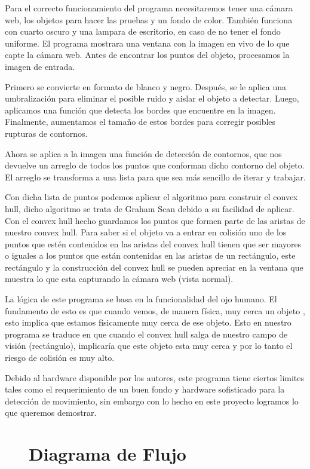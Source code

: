 \documentclass[11pt]{article}
\begin{document}
Para el correcto funcionamiento del programa necesitaremos tener una cámara web, los objetos para hacer las pruebas y un fondo de color. También funciona con cuarto oscuro y una lampara de escritorio, en caso de no tener el fondo uniforme. El programa mostrara una ventana con la imagen en vivo de lo que capte la cámara web. Antes de encontrar los puntos del objeto, procesamos la imagen de entrada.

Primero se convierte en formato de blanco y negro. Después, se le aplica una umbralización para eliminar el posible ruido y aislar el objeto a detectar. Luego, aplicamos una función que detecta los bordes que encuentre en la imagen. Finalmente, aumentamos el tamaño de estos bordes para corregir posibles rupturas de contornos.

Ahora se aplica a la imagen una función de detección de contornos, que nos devuelve un arreglo de todos los puntos que conforman dicho contorno del objeto. El arreglo se transforma a una lista para que sea más sencillo de iterar y trabajar.

Con dicha lista de puntos podemos aplicar el algoritmo para construir el convex hull, dicho algoritmo se trata de Graham Scan debido a su facilidad de aplicar. Con el convex hull hecho guardamos los puntos que formen parte de las aristas de nuestro convex hull. Para saber si el objeto va a entrar en colisión uno de los puntos que estén contenidos en las aristas del convex hull tienen que ser mayores o iguales a los puntos que están contenidas en las aristas de un rectángulo, este rectángulo y la construcción del convex hull se pueden apreciar en la ventana que muestra lo que esta capturando la cámara web (vista normal).

La lógica de este programa se basa en la funcionalidad del ojo humano. El fundamento de esto es que cuando vemos, de manera física, muy cerca un objeto , esto implica que estamos físicamente muy cerca de ese objeto. Esto en nuestro programa se traduce en que cuando el convex hull salga de nuestro campo de visión (rectángulo), implicaría que este objeto esta muy cerca y por lo tanto el riesgo de colisión es muy alto.

Debido al hardware disponible por los autores, este programa tiene ciertos limites tales como el requerimiento de un buen fondo y hardware sofisticado para la detección de movimiento, sin embargo con lo hecho en este proyecto logramos lo que queremos demostrar.
\begin{figure}[h!]
\section{Diagrama de Flujo}
\centering
\end{figure}
\end{document}
